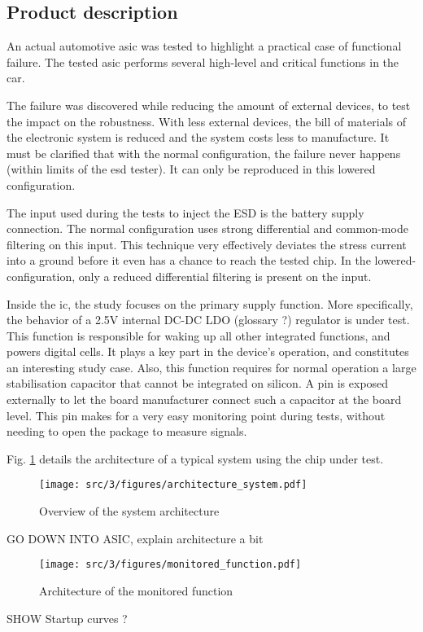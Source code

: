 \subsection{Product description}
\label{sec:product-desc}

An actual automotive \gls{asic} was tested to highlight a practical case of functional failure.
The tested \gls{asic} performs several high-level and critical functions in the car.

The failure was discovered while reducing the amount of external devices, to test the impact on the robustness.
With less external devices, the bill of materials of the electronic system is reduced and the system costs less to manufacture.
It must be clarified that with the normal configuration, the failure never happens (within limits of the \gls{esd} tester).
It can only be reproduced in this lowered configuration.

The input used during the tests to inject the \gls{ESD} is the battery supply connection.
The normal configuration uses strong differential and common-mode filtering on this input.
This technique very effectively deviates the stress current into a ground before it even has a chance to reach the tested chip.
In the lowered-configuration, only a reduced differential filtering is present on the input.

Inside the \gls{ic}, the study focuses on the primary supply function.
More specifically, the behavior of a 2.5V internal DC-DC LDO (glossary ?) regulator is under test.
This function is responsible for waking up all other integrated functions, and powers digital cells.
It plays a key part in the device's operation, and constitutes an interesting study case.
Also, this function requires for normal operation a large stabilisation capacitor that cannot be integrated on silicon.
A pin is exposed externally to let the board manufacturer connect such a capacitor at the board level.
This pin makes for a very easy monitoring point during tests, without needing to open the package to measure signals.

Fig. \ref{fig:system_architecture} details the architecture of a typical system using the chip under test.

\begin{figure}[!htbp]
  \centering
  \texttt{[image: src/3/figures/architecture\_system.pdf]}
  \caption{Overview of the system architecture}
  \label{fig:system_architecture}
\end{figure}

GO DOWN INTO ASIC, explain architecture a bit

\begin{figure}[!htbp]
  \centering
  \texttt{[image: src/3/figures/monitored\_function.pdf]}
  \caption{Architecture of the monitored function}
  \label{fig:monitored_function_first}
\end{figure}

SHOW Startup curves ?

